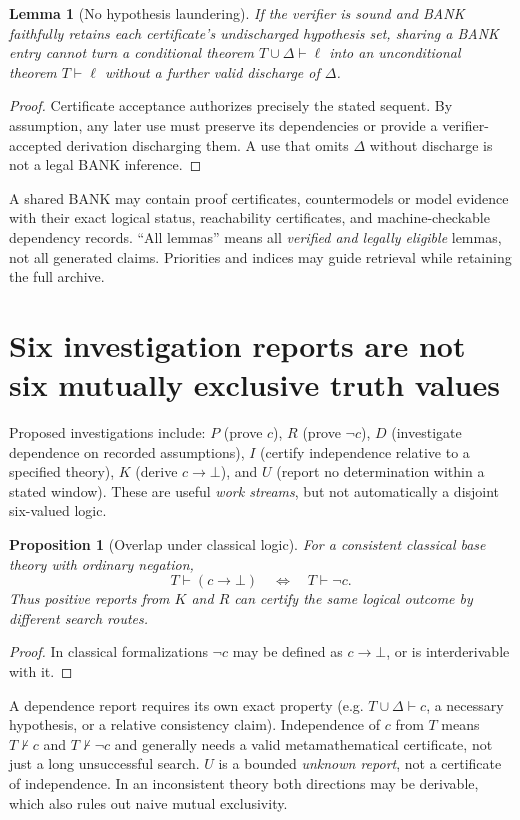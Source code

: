 \documentclass[11pt,letterpaper]{article}
\newtheorem{proposition}[definition]{Proposition}
\newtheorem{lemma}[definition]{Lemma}
\begin{document}
\begin{lemma}[No hypothesis laundering]
If the verifier is sound and BANK faithfully retains each certificate's undischarged hypothesis set, sharing a BANK entry cannot turn a conditional theorem $T\cup\Delta\vdash\ell$ into an unconditional theorem $T\vdash\ell$ without a further valid discharge of $\Delta$.
\end{lemma}
\begin{proof}
Certificate acceptance authorizes precisely the stated sequent. By assumption, any later use must preserve its dependencies or provide a verifier-accepted derivation discharging them. A use that omits $\Delta$ without discharge is not a legal BANK inference.\end{proof}

A shared BANK may contain proof certificates, countermodels or model evidence with their exact logical status, reachability certificates, and machine-checkable dependency records. ``All lemmas'' means all \emph{verified and legally eligible} lemmas, not all generated claims. Priorities and indices may guide retrieval while retaining the full archive.

\section{Six investigation reports are not six mutually exclusive truth values}
Proposed investigations include: $P$ (prove $c$), $R$ (prove $\neg c$), $D$ (investigate dependence on recorded assumptions), $I$ (certify independence relative to a specified theory), $K$ (derive $c\to\bot$), and $U$ (report no determination within a stated window). These are useful \emph{work streams}, but not automatically a disjoint six-valued logic.

\begin{proposition}[Overlap under classical logic]
For a consistent classical base theory with ordinary negation,
\[
T\vdash (c\to\bot)\quad\Longleftrightarrow\quad T\vdash\neg c.
\]
Thus positive reports from $K$ and $R$ can certify the same logical outcome by different search routes.
\end{proposition}
\begin{proof} In classical formalizations $\neg c$ may be defined as $c\to\bot$, or is interderivable with it.\end{proof}

A dependence report requires its own exact property (e.g. $T\cup\Delta\vdash c$, a necessary hypothesis, or a relative consistency claim). Independence of $c$ from $T$ means $T\nvdash c$ and $T\nvdash\neg c$ and generally needs a valid metamathematical certificate, not just a long unsuccessful search. $U$ is a bounded \emph{unknown report}, not a certificate of independence. In an inconsistent theory both directions may be derivable, which also rules out naive mutual exclusivity.
\end{document}
